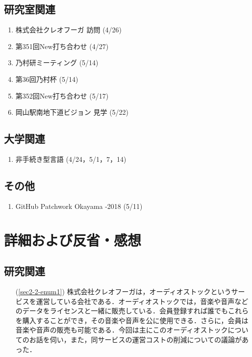 \documentclass[fleqn, 14pt]{extarticle}
\begin{document}
\subsection{研究室関連}
\label{sec2-2}
\begin{enumerate}
\item 株式会社クレオフーガ 訪問
  \hfill
  \label{sec2-2-enum1}
  (4/26)
\item 第351回New打ち合わせ
  \hfill
  \label{sec2-2-enum2}
  (4/27)
\item 乃村研ミーティング
  \hfill
  \label{sec2-2-enum3}
  (5/14)
\item 第36回乃村杯
  \hfill
  \label{sec4-2-enum2}
  (5/14)
\item 第352回New打ち合わせ
  \hfill
  \label{sec2-2-enum4}
  (5/17)
\item 岡山駅南地下道ビジョン 見学
  \hfill
  \label{sec2-2-enum5}
  (5/22)
\end{enumerate}

\subsection{大学関連}
\label{sec2-3}
\begin{enumerate}
\item 非手続き型言語
  \hfill
  \label{sec2-3-enum1}
  (4/24，5/1，7，14)
\end{enumerate}

\subsection{その他}
\label{sec2-4}
\begin{enumerate}
\item GitHub Patchwork Okayama -2018
  \hfill
  \label{sec2-4-enum1}
  (5/11)
\end{enumerate}

\section{詳細および反省・感想}
\label{sec3}
\subsection{研究関連}
\label{sec3-1}
\begin{itemize}
\item[(\ref{sec2-2-enum1})] 株式会社クレオフーガは，オーディオストックというサービスを運営している会社である．オーディオストックでは，音楽や音声などのデータをライセンスと一緒に販売している．会員登録すれば誰でもこれらを購入することができ，その音楽や音声を公に使用できる．さらに，会員は音楽や音声の販売も可能である．今回は主にこのオーディオストックについてのお話を伺い，また，同サービスの運営コストの削減についての議論があった．
\end{itemize}
\end{document}
